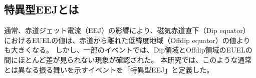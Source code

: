 \subsection{特異型EEJとは}

通常、赤道ジェット電流（EEJ）の影響により、磁気赤道直下（Dip equator）におけるEUELの値は、赤道から離れた低緯度地域（Offdip equator）の値よりも大きくなる。
しかし、一部のイベントでは、Dip領域とOffdip領域のEUELの間にほとんど差が見られない現象が確認された。
本研究では、このような通常とは異なる振る舞いを示すイベントを「特異型EEJ」と定義した。

